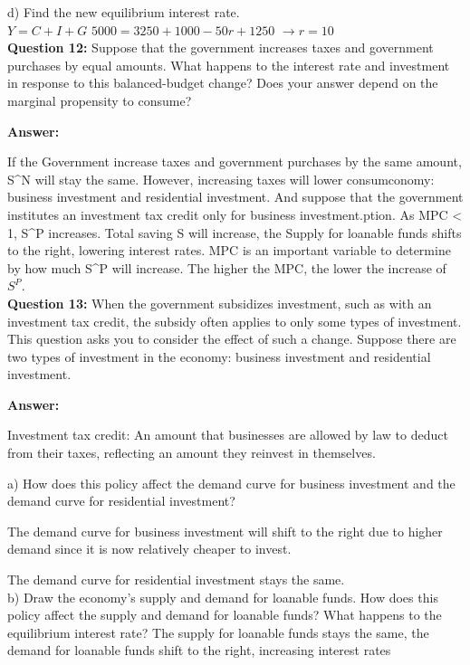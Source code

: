 \documentclass[a4paper, 11pt]{article}
\begin{document}
d) Find the new equilibrium interest rate.\\
$Y = C + I + G$
$5000 = 3250 + 1000 - 50r + 1250$
$\rightarrow r = 10$ 
\\

\textbf{Question 12:} Suppose that the government increases taxes and government purchases by equal amounts. What happens to the interest rate and investment in response to this balanced-budget change? Does your answer depend on the marginal propensity to consume?

\textbf{Answer:} 

If the Government increase taxes and government purchases by the same amount, S^{N} will stay the same. However, increasing taxes will lower consumconomy: business investment and residential investment. And suppose that the government institutes an investment tax credit only for business investment.ption. As MPC < 1, S^{P} increases. Total saving S will increase, the Supply for loanable funds shifts to the right, lowering interest rates. MPC is an important variable to determine by how much S^{P} will increase. The higher the MPC, the lower the increase of $S^{P}$. \\

\textbf{Question 13:} When the government subsidizes investment, such as with an investment tax credit, the subsidy often applies to only some types of investment. This question asks you to consider the effect of such a change. Suppose there are two types of investment in the economy: business investment and residential investment.

\textbf{Answer:}

Investment tax credit: An amount that businesses are allowed by law to deduct from their taxes, reflecting an amount they reinvest in themselves.

a) How does this policy affect the demand curve for business investment and the demand curve for residential investment?

The demand curve for business investment will shift to the right due to higher demand since it is now relatively cheaper to invest.

The demand curve for residential investment stays the same. \\

b) Draw the economy’s supply and demand for loanable funds. How does this policy affect the supply and demand for loanable funds? What happens to the equilibrium interest rate?
The supply for loanable funds stays the same, the demand for loanable funds shift to the right, increasing interest rates \\
\end{document}
